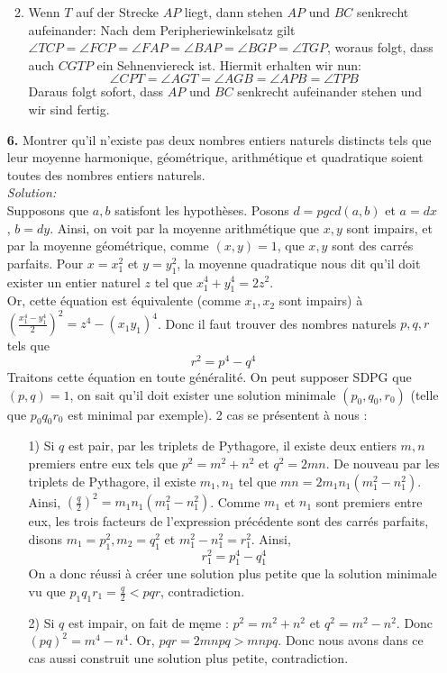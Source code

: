 \documentclass[12pt,a4paper]{article}
\theoremstyle{plain}
\theoremstyle{definition}
\theoremstyle{remark}
\begin{document}
\begin{enumerate}
\begin{enumerate}
\begin{figure}[h]
\end{figure}
\item Wenn $T$ auf der Strecke $AP$ liegt, dann stehen $AP$ und $BC$ senkrecht aufeinander: Nach dem Peripheriewinkelsatz gilt $\angle TCP=\angle FCP=\angle FAP=\angle BAP=\angle BGP=\angle TGP$, woraus folgt, dass auch $CGTP$ ein Sehnenviereck ist. Hiermit erhalten wir nun:
\[
\angle CPT=\angle AGT=\angle AGB=\angle APB=\angle TPB
\]
Daraus folgt sofort, dass $AP$ und $BC$ senkrecht aufeinander stehen und wir sind fertig.
\end{enumerate}

    \item[\textbf{6.}] Montrer qu'il n'existe pas deux nombres entiers naturels distincts tels que leur moyenne harmonique, géométrique, arithmétique et quadratique soient toutes des nombres entiers naturels.\\
	
\textit{Solution:}\\
Supposons que $a,b$ satisfont les hypothèses. Posons $d=pgcd(a,b)$ et $a=dx$, $b=dy$.
Ainsi, on voit par la moyenne arithmétique que $x,y$ sont impairs, et par la moyenne géométrique, comme $(x,y)=1$, que $x,y$ sont des carrés parfaits. Pour $x=x_1^2$ et $y=y_1^2$, la moyenne quadratique nous dit qu'il doit exister un entier naturel $z$ tel que $x_1^4+y_1^4=2z^2$. \\
Or, cette équation est équivalente (comme $x_1,x_2$ sont impairs) à $(\frac{x_1^4-y_1^4}{2})^2=z^4-(x_1y_1)^4$. Donc il faut trouver des nombres naturels $p,q,r$ tels que 
\[
r^2=p^4-q^4
\]
Traitons cette équation en toute généralité. On peut supposer SDPG que $(p,q)=1$, on sait qu'il doit exister une solution minimale $(p_0,q_0,r_0)$ (telle que $p_0q_0r_0$ est minimal par exemple). 2 cas se présentent à nous :

\begin{itemize}
    \item[1)] Si $q$ est pair, par les triplets de Pythagore, il existe deux entiers $m,n$ premiers entre eux tels que $p^2=m^2+n^2$ et $q^2=2mn$. De nouveau par les triplets de Pythagore, il existe $m_1, n_1$ tel que $mn=2m_1n_1(m_1^2-n_1^2)$. Ainsi, $(\frac{q}{2})^2=m_1n_1(m_1^2-n_1^2)$. Comme $m_1$ et $n_1$ sont premiers entre eux, les trois facteurs de l'expression précédente sont des carrés parfaits, disons $m_1=p_1^2, m_2=q_1^2$ et $m_1^2-n_1^2=r_1^2$. Ainsi,\[r_1^2=p_1^4-q_1^4\]
On a donc réussi à créer une solution plus petite que la solution minimale vu que $p_1q_1r_1=\frac{q}{2}<pqr$, contradiction.
    \item[2)] Si $q$ est impair, on fait de męme : $p^2=m^2+n^2$ et $q^2=m^2-n^2$. Donc $(pq)^2=m^4-n^4$. Or, $pqr=2mnpq>mnpq$. Donc nous avons dans ce cas aussi construit une solution plus petite, contradiction.
\end{itemize}


\end{enumerate}
\end{document}
